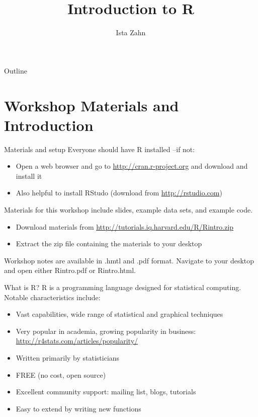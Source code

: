 \documentclass[table,smaller]{beamer}
\author{Ista Zahn}
\date{}
\title{Introduction to R}
\begin{document}
\maketitle
\begin{frame}{Outline}
\tableofcontents
\end{frame}



\section{Workshop Materials and Introduction}
\label{sec-1}

\begin{frame}[label=sec-1-1]{Materials and setup}
Everyone should have R installed --if not:

\begin{itemize}
\item Open a web browser and go to \url{http://cran.r-project.org} and download and install it
\item Also helpful to install RStudo (download from \url{http://rstudio.com})
\end{itemize}

Materials for this workshop include slides, example data sets, and example code.

\begin{itemize}
\item Download materials from \url{http://tutorials.iq.harvard.edu/R/Rintro.zip}
\item Extract the zip file containing the materials to your desktop
\end{itemize}

Workshop notes are available in .hmtl and .pdf format. Navigate to your desktop and open either Rintro.pdf or Rintro.html.
\end{frame}


\begin{frame}[label=sec-1-2]{What is R?}
R is a programming language designed for statistical computing. Notable characteristics include:

\begin{itemize}
\item Vast capabilities, wide range of statistical and graphical techniques

\item Very popular in academia, growing popularity in business: \url{http://r4stats.com/articles/popularity/}

\item Written primarily by statisticians

\item FREE (no cost, open source)

\item Excellent community support: mailing list, blogs, tutorials

\item Easy to extend by writing new functions
\end{itemize}
\end{frame}
\end{document}
